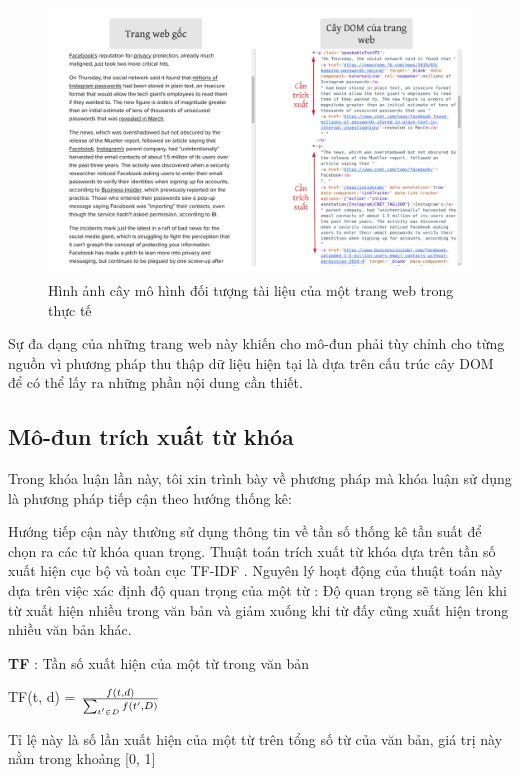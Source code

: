 \documentclass[12pt]{report}
\begin{document}
\begin{figure}[h]
	\centering
	\includegraphics[scale=0.3]{DOM-tree}
	\caption{Hình ảnh cây mô hình đối tượng tài liệu của một trang web trong thực tế	}
\end{figure}

Sự đa dạng của những trang web này khiến cho mô-đun phải tùy chỉnh cho từng nguồn vì phương pháp thu thập dữ liệu hiện tại là dựa trên cấu trúc cây DOM để  có  thể lấy ra những phần nội dung cần thiết. 

\newpage
\subsection{Mô-đun trích xuất từ khóa}

Trong khóa luận lần này, tôi xin trình bày về phương pháp mà khóa luận sử dụng là phương pháp tiếp cận theo hướng thống kê:

Hướng tiếp cận này thường sử dụng thông tin về tần số thống kê tần suất để chọn ra các từ khóa quan trọng. Thuật toán trích xuất từ khóa dựa trên tần số xuất hiện cục bộ và toàn cục TF-IDF \cite{cia-tfidf}  . Nguyên lý hoạt động của thuật toán này dựa trên việc xác định độ quan trọng của một từ : Độ quan trọng sẽ tăng lên khi từ xuất hiện nhiều trong văn bản và giảm xuống khi từ đấy cũng xuất hiện trong nhiều văn bản khác.

\textbf{TF} : Tần số xuất hiện của một từ trong văn bản
\begin{center}
	TF(t, d) = $\mbox{\Huge}\frac{f(t, d)}{ \sum_{t' \in D} f(t', D)}$	
\end{center}

Tỉ lệ này là số lần xuất hiện của một từ trên tổng số từ của văn bản, giá trị này nằm trong khoảng [0, 1]
\end{document}
